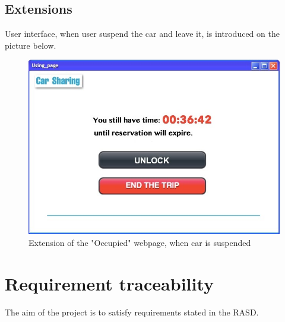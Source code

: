 \documentclass[12pt, letterpaper]{article}
\begin{document}
\subsection{Extensions}
User interface, when user suspend the car and leave it, is introduced on the picture below.
\begin{figure}[H]
\centering
\includegraphics[width=\textwidth]{Extens.jpg} 
\caption{Extension of the "Occupied" webpage, when car is suspended}
\label{fig:Extens}
\end{figure}




\newpage
\section{Requirement traceability}

The aim of the project is to satisfy requirements stated in the RASD.
\end{document}
